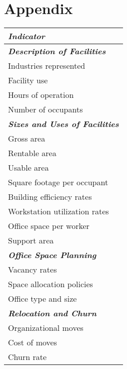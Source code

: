 
\section{Appendix} %
\setcounter{table}{0} \renewcommand{\thefigure}{A.\arabic{figure}}

\begin{table}[h!]
	\vspace{0cm}
	\begin{adjustwidth}{3cm}{0cm}
	\resizebox{6cm}{!} {
	\begin{tabular}{l}

		\hline
		{\bf {\emph{Indicator}}} \\
		\hline
		{\bf {\emph{Description of Facilities}}} \\
		Industries represented \\
		Facility use \\
		Hours of operation \\ 
		Number of occupants \\ 
		\hline

		{\bf {\emph{Sizes and Uses of Facilities}}} \\
		Gross area \\
		Rentable area \\ 
		Usable area \\ 
		Square footage per occupant \\ 
		Building efficiency rates \\ 
		Workstation utilization rates \\ 
		Office space per worker \\ 
		Support area \\ 
		\hline

		{\bf {\emph{Office Space Planning}}} \\
		Vacancy rates \\
		Space allocation policies \\ 
		Office type and size \\ 
		\hline

		{\bf {\emph{Relocation and Churn}}} \\
		Organizational moves \\
		Cost of moves \\ 
		Churn rate \\ 
		\hline


\end{tabular}}
\end{adjustwidth}
\end{table}
